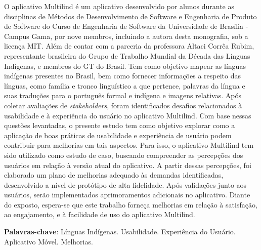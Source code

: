 \begin{resumo}
    O aplicativo Multilind é um aplicativo desenvolvido por alunos durante as disciplinas de Métodos de Desenvolvimento de Software e Engenharia de Produto de Software do
    Curso de Engenharia de Software da Universidade de Brasília - Campus Gama, por nove membros, incluindo a autora desta monografia, sob a licença MIT. Além de contar com a parceria 
    da professora Altaci Corrêa Rubim, representante brasileira do Grupo de Trabalho Mundial da Década das Línguas Indígenas, e membros do GT do Brasil. Tem como objetivo mapear as línguas indígenas presentes no Brasil, bem como fornecer informações a respeito das línguas, como família e tronco linguístico a que pertence, palavras 
    da língua e suas traduções para o português formal e indígena e imagens relativas. Após coletar avaliações de \textit{stakeholders}, foram identificados desafios relacionados à usabilidade e à experiência do usuário no aplicativo Multilind. Com base 
    nessas questões levantadas, o presente estudo tem como objetivo explorar como a aplicação de boas práticas de usabilidade e experiência de usuário podem contribuir para melhorias 
    em tais aspectos. Para isso, o aplicativo Multilind tem sido utilizado como estudo de caso, buscando compreender as percepções dos usuários em relação à versão atual do aplicativo. A partir dessas 
    percepções, foi elaborado um plano de melhorias adequado às demandas identificadas, desenvolvido a nível de protótipo de alta fidelidade. Após validações junto aos usuários, serão 
    implementados aprimoramentos adicionais no aplicativo. Diante do exposto, espera-se que este trabalho forneça melhorias em relação à satisfação, ao engajamento, e à facilidade de uso do aplicativo Multilind.
    
 \vspace{\onelineskip}
    
 \noindent
 \textbf{Palavras-chave}: Línguas Indígenas. Usabilidade. Experiência do Usuário. Aplicativo Móvel. Melhorias.
\end{resumo}
